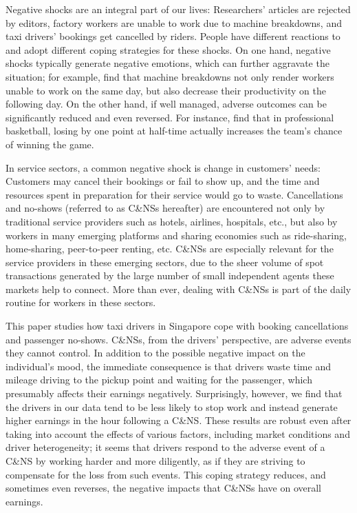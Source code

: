 \documentclass[reviewmode]{AEA}
\begin{document}
Negative shocks are an integral part of our lives: Researchers' articles are rejected by editors, factory workers are unable to work due to machine breakdowns, and taxi drivers' bookings get cancelled by riders. People have different reactions to and adopt different coping strategies for these shocks. On one hand, negative shocks typically generate negative emotions, which can further aggravate the situation; for example, \citet{cai2017recover} find that machine breakdowns not only render workers unable to work on the same day, but also decrease their productivity on the following day. On the other hand, if well managed, adverse outcomes can be significantly reduced and even reversed. For instance, \citet{berger2011can} find that in professional basketball, losing by one point at half-time actually increases the team's chance of winning the game.

In service sectors, a common negative shock is change in customers' needs: Customers may cancel their bookings or fail to show up, and the time and resources spent in preparation for their service would go to waste. Cancellations and no-shows (referred to as C\&NSs hereafter) are encountered not only by traditional service providers such as hotels, airlines, hospitals, etc., but also by workers in many emerging platforms and sharing economies such as ride-sharing, home-sharing, peer-to-peer renting, etc. C\&NSs are especially relevant for the service providers in these emerging sectors, due to the sheer volume of spot transactions generated by the large number of small independent agents these markets help to connect. More than ever, dealing with C\&NSs is part of the daily routine for workers in these sectors.

This paper studies how taxi drivers in Singapore cope with booking cancellations and passenger no-shows. C\&NSs, from the drivers' perspective, are adverse events they cannot control. In addition to the possible negative impact on the individual's mood, the immediate consequence is that drivers waste time and mileage driving to the pickup point and waiting for the passenger, which presumably affects their earnings negatively. Surprisingly, however, we find that the drivers in our data tend to be less likely to stop work and instead generate higher earnings in the hour following a C\&NS. These results are robust even after taking into account the effects of various factors, including market conditions and driver heterogeneity; it seems that drivers respond to the adverse event of a C\&NS by  working harder and more diligently, as if they are striving to compensate for the loss from such events. This coping strategy reduces, and sometimes even reverses, the negative impacts that C\&NSs have on overall earnings.
\end{document}
